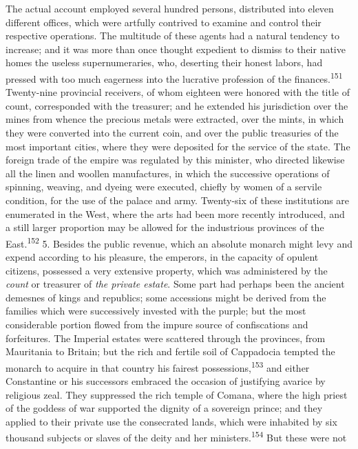 The actual account employed several hundred persons, distributed
into eleven different offices, which were artfully contrived to
examine and control their respective operations. The multitude of
these agents had a natural tendency to increase; and it was more
than once thought expedient to dismiss to their native homes the
useless supernumeraries, who, deserting their honest labors, had
pressed with too much eagerness into the lucrative profession of
the finances.\textsuperscript{151} Twenty-nine provincial receivers, of whom
eighteen were honored with the title of count, corresponded with
the treasurer; and he extended his jurisdiction over the mines
from whence the precious metals were extracted, over the mints,
in which they were converted into the current coin, and over the
public treasuries of the most important cities, where they were
deposited for the service of the state. The foreign trade of the
empire was regulated by this minister, who directed likewise all
the linen and woollen manufactures, in which the successive
operations of spinning, weaving, and dyeing were executed,
chiefly by women of a servile condition, for the use of the
palace and army. Twenty-six of these institutions are enumerated
in the West, where the arts had been more recently introduced,
and a still larger proportion may be allowed for the industrious
provinces of the East.\textsuperscript{152} 5. Besides the public revenue, which
an absolute monarch might levy and expend according to his
pleasure, the emperors, in the capacity of opulent citizens,
possessed a very extensive property, which was administered by
the \textit{count} or treasurer of \textit{the private estate}. Some part had
perhaps been the ancient demesnes of kings and republics; some
accessions might be derived from the families which were
successively invested with the purple; but the most considerable
portion flowed from the impure source of confiscations and
forfeitures. The Imperial estates were scattered through the
provinces, from Mauritania to Britain; but the rich and fertile
soil of Cappadocia tempted the monarch to acquire in that country
his fairest possessions,\textsuperscript{153} and either Constantine or his
successors embraced the occasion of justifying avarice by
religious zeal. They suppressed the rich temple of Comana, where
the high priest of the goddess of war supported the dignity of a
sovereign prince; and they applied to their private use the
consecrated lands, which were inhabited by six thousand subjects
or slaves of the deity and her ministers.\textsuperscript{154} But these were not
